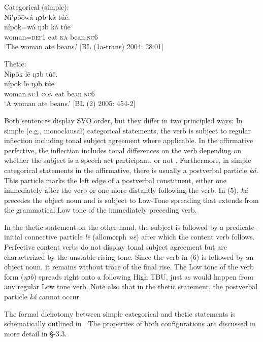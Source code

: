 \documentclass[output=paper]{langsci/langscibook}
\begin{document}
\ea
 Categorical (simple):  \\
\glll Ni\'{ }p\={o}\={o}wá  ŋɔb  kà  túé.\\
    \textup{níp\={o}k=wá  }\textup{ŋɔb  k}\textup{á}\textup{  túe}\\
     woman=\textsc{def}1  eat  \textsc{ka}  bean.\textsc{nc}6\\
\glt ‘The woman ate beans.’ [BL (1a-trans) 2004: 28.01]
\z

\ea
 Thetic:\\
\glll Níp\={o}k    l\={e}  ŋɔb  tù\={e}.\\
     \textup{níp\={o}k    l\={e}  }\textup{ŋɔb  túe}\\
     woman.\textsc{nc}1  \textsc{con}  eat  bean.\textsc{nc}6\\
\glt ‘A woman ate beans.’ [BL (2) 2005: 454-2]
\z

Both sentences display SVO order, but they differ in two principled ways: In simple (e.g., monoclausal) categorical statements, the verb is subject to regular inflection including tonal subject agreement where applicable. In the affirmative perfective, the inflection includes tonal differences on the verb depending on whether the subject is a speech act participant, or not \citep{Schwarz2007}. Furthermore, in simple categorical statements in the affirmative, there is usually a postverbal particle \textit{ká. }This particle marks the left edge of a postverbal constituent, either one immediately after the verb or one more distantly following the verb. In (5), \textit{ká }precedes the object noun and is subject to Low-Tone spreading that extends from the grammatical Low tone of the immediately preceding verb.

In the thetic statement on the other hand, the subject is followed by a predicate-initial connective particle \textit{l}\textit{\={e}}\textit{ }(allomorph \textit{n\={e}}) after which the content verb follows. Perfective content verbs do not display tonal subject agreement but are characterized by the unstable rising tone. Since the verb in (6) is followed by an object noun, it remains without trace of the final rise. The Low tone of the verb form (\textit{ŋɔb}) spreads right onto a following High TBU, just as would happen from any regular Low tone verb. Note also that in the thetic statement, the postverbal particle \textit{ká }cannot occur.

  The formal dichotomy between simple categorical and thetic statements is schematically outlined in . The properties of both configurations are discussed in more detail in §-3.3.
 
\end{document}
